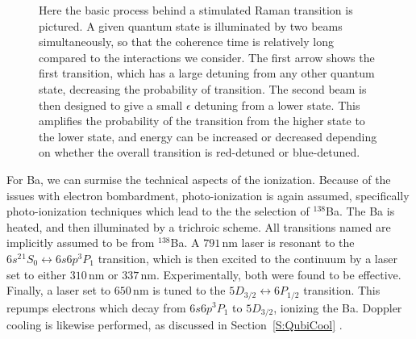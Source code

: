 \documentclass[12pt,a4paper]{amsart}
\numberwithin{equation}{section}
\theoremstyle{plain}
\theoremstyle{definition}
\begin{document}
\begin{figure}
\centering
{}
    \caption{Here the basic process behind a stimulated Raman transition is pictured. A given quantum state is illuminated by two beams simultaneously, so that the coherence time is relatively long compared to the interactions we consider. The first arrow shows the first transition, which has a large detuning from any other quantum state, decreasing the probability of transition. The second beam is then designed to give a small $\epsilon$ detuning from a lower state. This amplifies the probability of the transition from the higher state to the lower state, and energy can be increased or decreased depending on whether the overall transition is red-detuned or blue-detuned.}
\label{fig:YbPhosrftkhgjo}
\end{figure}

For Ba, we can surmise the technical aspects of the ionization. Because of the issues with electron bombardment, photo-ionization is again assumed, specifically photo-ionization techniques which lead to the the selection of ${}^{138}$Ba. The Ba is heated, and then illuminated by a trichroic scheme. All transitions named are implicitly assumed to be from ${}^{138}$Ba. A $791\,$nm laser is resonant to the $6s^2 {}^1S_0 \leftrightarrow  6s6p {}^3P_1$ transition, which is then excited to the continuum by a laser set to either $310\,$nm or $337\,$nm. Experimentally, both were found to be effective. Finally, a laser set to $650\,$nm is tuned to the $5D_{3/2}\leftrightarrow 6P_{1/2}$ transition. This repumps electrons which decay from $6s6p {}^3P_1$ to $5D_{3/2}$, ionizing the Ba. Doppler cooling is likewise performed, as discussed in Section~\ref{S:QubiCool} \cite{ioniBariLoad}.
\end{document}
